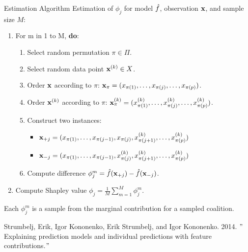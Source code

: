 \documentclass[11pt,compress,t,notes=noshow, aspectratio=169, xcolor=table]{beamer}
\begin{document}
\begin{vbframe}{Estimation Algorithm}
Estimation of $\phi_j$ for model $\fh$, observation $\xv$, and sample size $M$:
\vspace{0.25cm}
  \begin{enumerate}
      \item For m in 1 to M, \textbf{do}:
      \begin{enumerate}
        \item Select random permutation $\pi \in \Pi$.
        \item Select random data point $\xv^{(k)} \in X$.
        \item Order $\xv$ according to $\pi$: $\xv_{\pi} = (x_{\pi(1)}, \ldots, x_{\pi(j)}, \ldots, x_{\pi(p)})$.
        \item Order $\xk$ according to $\pi$: $\xk_{\pi} = (x^{(k)}_{\pi(1)}, \ldots, x^{(k)}_{\pi(j)}, \ldots, x^{(k)}_{\pi(p)})$.
        \item Construct two instances:
          \begin{itemize}
            \item $\xv_{+j} = (x_{\pi(1)}, \ldots, x_{\pi(j - 1)}, x_{\pi(j)}, x^{(k)}_{\pi(j + 1)}, \ldots, x^{(k)}_{\pi(p)}) $
            \item $\xv_{-j} = (x_{\pi(1)}, \ldots, x_{\pi(j - 1)}, x^{(k)}_{\pi(j)}, x^{(k)}_{\pi(j + 1)}, \ldots, x^{(k)}_{\pi(p)}) $
          \end{itemize}
        \item Compute difference $\phi_j^m = \fh(\xv_{+j}) - \fh(\xv_{-j})$.
      \end{enumerate}
    \item Compute Shapley value $\phi_j = \frac{1}{M}\sum_{m=1}^M \phi_j^m$.
  \end{enumerate}

  Each $\phi_j^m$ is a sample from the marginal contribution for a sampled coalition.

    \vspace{0.25cm}
    \tiny{Strumbelj, Erik, Igor Kononenko, Erik Strumbelj, and Igor Kononenko. 2014. $"$Explaining prediction models and individual predictions with feature contributions.$"$}

\end{vbframe}
\end{document}
